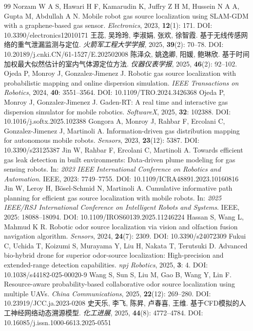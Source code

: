 \documentclass{aas}
\newcommand{\raresheng}{{\rarehanfont 昇}}
\begin{document}
\begin{thebibliography}{99}
 Norzam W A S, Hawari H F, Kamarudin K, Juffry Z H M, Hussein N A A, Gupta M, Abdullah A N. Mobile robot gas source localization using SLAM-GDM with a graphene-based gas sensor. {\sl Electronics}, 2023, {\bf 12}(1): 171. DOI: 10.3390/electronics12010171
 王蕊, 吴玲玲, 李淑娟, 张欢, 徐智霞. 基于无线传感网络的重气泄漏监测与定位. {\sl 火箭军工程大学学报}, 2025, {\bf 39}(2): 70--78. DOI: 10.20189/j.cnki.CN/61-1527/E.202502008
 陈泽众, 姚逸卿, 阳媛, 鲍琳欣. 基于时间加权最大似然估计的室内气体源定位方法. {\sl 仪器仪表学报}, 2025, {\bf 46}(2): 92--102.
 Ojeda P, Monroy J, Gonzalez-Jimenez J. Robotic gas source localization with probabilistic mapping and online dispersion simulation. {\sl IEEE Transactions on Robotics}, 2024, {\bf 40}: 3551--3564. DOI: 10.1109/TRO.2024.3426368
 Ojeda P, Monroy J, Gonzalez-Jimenez J. Gaden-RT: A real time and interactive gas dispersion simulator for mobile robotics. {\sl SoftwareX}, 2025, {\bf 32}: 102388. DOI: 10.1016/j.softx.2025.102388
 Gongora A, Monroy J, Rahbar F, Ercolani C, Gonzalez-Jimenez J, Martinoli A. Information-driven gas distribution mapping for autonomous mobile robots. {\sl Sensors}, 2023, {\bf 23}(12): 5387. DOI: 10.3390/s23125387
 Jin W, Rahbar F, Ercolani C, Martinoli A. Towards efficient gas leak detection in built environments: Data-driven plume modeling for gas sensing robots. In: {\sl 2023 IEEE International Conference on Robotics and Automation}. IEEE, 2023: 7749--7755. DOI: 10.1109/ICRA48891.2023.10160816
 Jin W, Leroy H, Bösel-Schmid N, Martinoli A. Cumulative informative path planning for efficient gas source localization with mobile robots. In: {\sl 2025 IEEE/RSJ International Conference on Intelligent Robots and Systems}. IEEE, 2025: 18088--18094. DOI: 10.1109/IROS60139.2025.11246224
 Hassan S, Wang L, Mahmud K R. Robotic odor source localization via vision and olfaction fusion navigation algorithm. {\sl Sensors}, 2024, {\bf 24}(7): 2309. DOI: 10.3390/s24072309
 Fukui C, Uchida T, Koizumi S, Murayama Y, Liu H, Nakata T, Terutsuki D. Advanced bio-hybrid drone for superior odor-source localization: High-precision and extended-range detection capabilities. {\sl npj Robotics}, 2025, {\bf 3}: 4. DOI: 10.1038/s44182-025-00020-9
 Wang S, Sun S, Liu M, Gao B, Wang Y, Lin F. Resource-aware probability-based collaborative odor source localization using multiple UAVs. {\sl China Communications}, 2025, {\bf 22}(12): 269--280. DOI: 10.23919/JCC.ja.2023-0208
 史天乐, 李飞, 陈\raresheng, 卢春喜, 王维. 基于CFD模拟的人工神经网络动态溯源模型. {\sl 化工进展}, 2025, {\bf 44}(8): 4772--4784. DOI: 10.16085/j.issn.1000-6613.2025-0551

\end{thebibliography}
\end{document}
